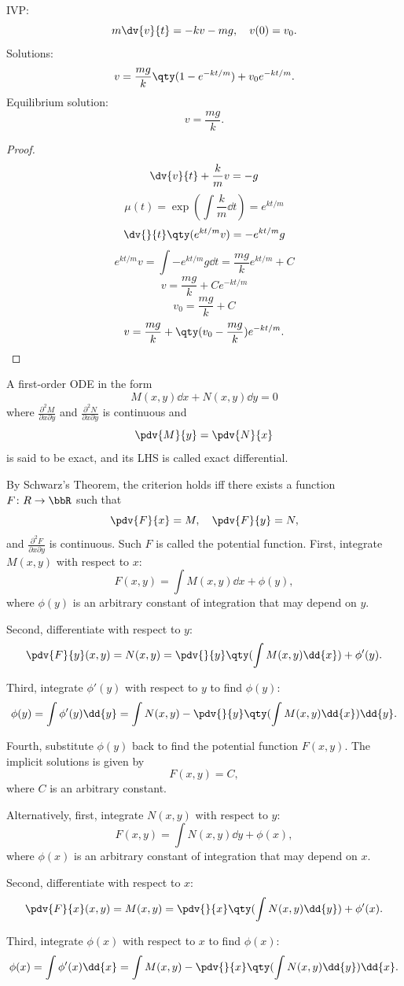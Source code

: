 \documentclass[a4paper,12pt]{report}
\begin{document}
IVP:
\[m\dv{v}{t}=-kv-mg,\quad v(0)=v_0.\]
Solutions:
\[v=\frac{mg}{k}\qty(1-e^{-kt/m})+v_0e^{-kt/m}.\]
Equilibrium solution:
\[v=\frac{mg}{k}.\]
\begin{proof}
\[\dv{v}{t}+\frac{k}{m}v=-g\]
\[\mu(t)=\exp(\int\frac{k}{m}\dd{t})=e^{kt/m}\]
\[\dv{}{t}\qty(e^{kt/m}v)=-e^{kt/m}g\]
\[e^{kt/m}v=\int-e^{kt/m}g\dd{t}=\frac{mg}{k}e^{kt/m}+C\]
\[v=\frac{mg}{k}+Ce^{-kt/m}\]
\[v_0=\frac{mg}{k}+C\]
\[v=\frac{mg}{k}+\qty(v_0-\frac{mg}{k})e^{-kt/m}.\]
\end{proof}
A first-order ODE in the form
\[M(x,y)\dd{x}+N(x,y)\dd{y}=0\]
where $\frac{\partial^2M}{\partial x\partial y}$ and $\frac{\partial^2N}{\partial x\partial y}$ is continuous and
\[\pdv{M}{y}=\pdv{N}{x}\]
is said to be exact, and its LHS is called exact differential.

By Schwarz's Theorem, the criterion holds iff there exists a function $F\colon R\to\bbR$ such that
\[\pdv{F}{x}=M,\quad\pdv{F}{y}=N,\]
and $\frac{\partial^2F}{\partial x\partial y}$ is continuous. Such $F$ is called the potential function.
First, integrate $M(x,y)$ with respect to $x$:
\[F(x,y)=\int M(x,y)\dd{x}+\phi(y),\]
where $\phi(y)$ is an arbitrary constant of integration that may depend on $y$.

Second, differentiate with respect to $y$:
\[\pdv{F}{y}(x,y)=N(x,y)=\pdv{}{y}\qty(\int M(x,y)\dd{x})+\phi'(y).\]

Third, integrate $\phi'(y)$ with respect to $y$ to find $\phi(y)$:
\[\phi(y)=\int\phi'(y)\dd{y}=\int N(x,y)-\pdv{}{y}\qty(\int M(x,y)\dd{x})\dd{y}.\]

Fourth, substitute $\phi(y)$ back to find the potential function $F(x,y)$. The implicit solutions is given by
\[F(x,y)=C,\]
where $C$ is an arbitrary constant.

Alternatively, first, integrate $N(x,y)$ with respect to $y$:
\[F(x,y)=\int N(x,y)\dd{y}+\phi(x),\]
where $\phi(x)$ is an arbitrary constant of integration that may depend on $x$.

Second, differentiate with respect to $x$:
\[\pdv{F}{x}(x,y)=M(x,y)=\pdv{}{x}\qty(\int N(x,y)\dd{y})+\phi'(x).\]

Third, integrate $\phi(x)$ with respect to $x$ to find $\phi(x)$:
\[\phi(x)=\int\phi'(x)\dd{x}=\int M(x,y)-\pdv{}{x}\qty(\int N(x,y)\dd{y})\dd{x}.\]
\end{document}
